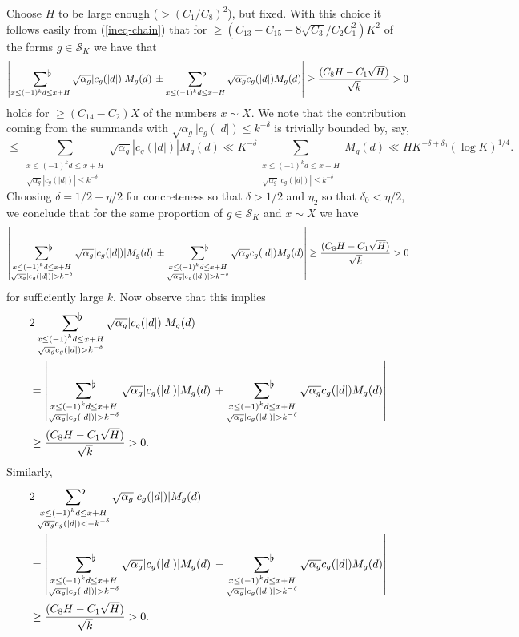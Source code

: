 \documentclass[a4paper,10pt,twoside]{amsart}
\theoremstyle{definition}
\numberwithin{equation}{section}
\renewcommand\:{\colon}
\newcommand{\sumflat}{\mathop{{\sum}^{\raisebox{-3pt}{\makebox[0pt][l]{$\flat$}}}}}
\begin{document}
Choose $H$ to be large enough ($>(C_1/C_8)^2$), but fixed. With this choice it follows easily from (\ref{ineq-chain}) that for $\geq (C_{13}-C_{15}-8\sqrt{C_3}/C_2C_1^2)K^2$ of the forms $g\in\mathcal S_K$ we have that
\[ 
\left|\sumflat_{x\leq (-1)^kd\leq x+H}\sqrt{\alpha_g}|c_g(|d|)|M_g(d)\,\pm\sumflat_{x\leq (-1)^kd\leq x+H}\sqrt{\alpha_g}c_g(|d|)M_g(d)\right|\geq \frac{(C_8H-C_1\sqrt H)}{\sqrt k}>0
\]
holds for $\geq (C_{14}-C_2)X$ of the numbers $x\sim X$. We note that the contribution coming from the summands with $\sqrt{\alpha_g}|c_g(|d|)\leq k^{-\delta}$ is trivially bounded by, say,
\[
\leq \sum_{\substack{x\leq (-1)^k d\leq x+H\\
\sqrt{\alpha_g} |c_g(|d|)|\leq k^{-\delta}}}\sqrt{\alpha_g}|c_g(|d|)|M_g(d)\ll K^{-\delta} \sum_{\substack{x\leq (-1)^k d\leq x+H\\
\sqrt{\alpha_g} |c_g(|d|)|\leq k^{-\delta}}}M_g(d)\ll  HK^{-\delta+\delta_0}(\log K)^{1/4}.
\]
Choosing $\delta=1/2+\eta/2$ for concreteness so that $\delta>1/2$ and $\eta_2$ so that $\delta_0<\eta/2$, we conclude that for the same proportion of $g\in \mathcal S_K$ and $x\sim X$ we have
\[
\left|\sumflat_{\substack{x\leq (-1)^kd\leq x+H\\
\sqrt{\alpha_g}|c_g(|d|)|> k^{-\delta}}}\sqrt{\alpha_g}|c_g(|d|)|M_g(d)\,\pm\sumflat_{\substack{x\leq (-1)^kd\leq x+H\\
\sqrt{\alpha_g}|c_g(|d|)|> k^{-\delta}}}\sqrt{\alpha_g}c_g(|d|)M_g(d)\right|\geq \frac {(C_8H-C_1\sqrt H)}{\sqrt k}>0
\]
for sufficiently large $k$. Now observe that this implies 
\begin{align*}
& 2\sumflat_{\substack{x\leq (-1)^kd\leq x+H\\
\sqrt{\alpha_g}c_g(|d|)> k^{-\delta}}}\sqrt{\alpha_g}|c_g(|d|)|M_g(d)\\
&=\left|\sumflat_{\substack{x\leq (-1)^kd\leq x+H\\
\sqrt{\alpha_g}|c_g(|d|)|> k^{-\delta}}}\sqrt{\alpha_g}|c_g(|d|)|M_g(d)\,+\sumflat_{\substack{x\leq (-1)^kd\leq x+H\\
\sqrt{\alpha_g}|c_g(|d|)|> k^{-\delta}}}\sqrt{\alpha_g}c_g(|d|)M_g(d)\right|\\
&\geq \frac{(C_8 H-C_1\sqrt H)}{\sqrt k}>0.
\end{align*}
Similarly,
\begin{align*}
& 2\sumflat_{\substack{x\leq (-1)^kd\leq x+H\\
\sqrt{\alpha_g}c_g(|d|)< -k^{-\delta}}}\sqrt{\alpha_g}|c_g(|d|)|M_g(d)\\
&=\left|\sumflat_{\substack{x\leq (-1)^kd\leq x+H\\
\sqrt{\alpha_g}|c_g(|d|)|> k^{-\delta}}}\sqrt{\alpha_g}|c_g(|d|)|M_g(d)\,-\sumflat_{\substack{x\leq (-1)^kd\leq x+H\\
\sqrt{\alpha_g}|c_g(|d|)|> k^{-\delta}}}\sqrt{\alpha_g}c_g(|d|)M_g(d)\right|\\
&\geq \frac{(C_8H-C_1\sqrt H)}{\sqrt k}>0.
\end{align*}
\end{document}

